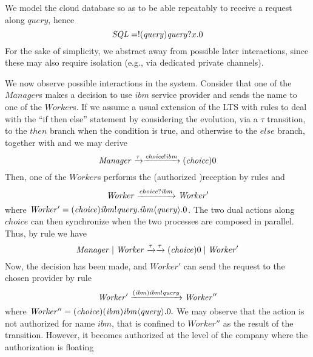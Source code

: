 We model the cloud database so as to be able repeatably to receive a request along $\mathit{query}$, hence
%
$$
\mathit{SQL}= \repreceive{{\mathit{query}}}\role\msg\NX.%
\inact
$$
%
For the sake of simplicity, we abstract away from possible later interactions, 
since these may also require isolation (e.g., via dedicated private channels).

We now observe possible interactions in the system. 
Consider that one of the $\mathit{Manager}$s makes a decision to use $\mathit{ibm}$ service provider and sends the name to one of the $\mathit{Worker}$s. 
If we assume a usual extension of the LTS with rules to deal with the ``if then else'' statement by considering the evolution, via a $\tau$ transition, to the $\mathit{then}$ branch when the condition is true, and otherwise to the $\mathit{else}$ branch, together with  and  we may derive
%
$$\mathit{Manager}\xrightarrow{\tau}\xrightarrow{
\mathit{choice}!\mathit{ibm}} 
(\mathit{choice})0$$
% 
Then, one of the $\mathit{Worker}$s performs the (authorized )reception by 
 rules  and 
%
$$\mathit{Worker}\xrightarrow{\mathit{choice}?\mathit{ibm}}\mathit{Worker'}$$
%
where 
$\mathit{Worker'}=\scope{{\mathit{choice}}}\send{{\mathit{ibm}}}\role\msg{\mathit{query}}. \sauth{{\mathit{ibm}}}\role\msg{{\mathit{query}}}.\inact%
$.
The two dual actions along $\mathit{choice}$ can then synchronize when the two processes are composed in parallel. Thus, by rule  we have
%
$$\mathit{Manager} \;|\; \mathit{Worker}\xrightarrow{\tau} \xrightarrow{\tau} (\mathit{choice})0 \;|\; \mathit{Worker'}$$
%
Now, the decision has been made, and $\mathit{Worker'}$ can send the request to the chosen provider by rule 
%
$$\mathit{Worker'}\xrightarrow{{(\mathit{ibm})}\mathit{ibm}!\mathit{query}}
\mathit{Worker''}$$
%
where $\mathit{Worker''}=({\mathit{choice}})(\mathit{ibm}) {\mathit{ibm}}\langle{\mathit{query}}\rangle.0.$ %
We may observe that the action is not authorized for name $\mathit{ibm}$, that is confined to $\mathit{Worker''}$ as the result of the transition. 
However, it becomes authorized at the level of the company where the authorization is floating 
